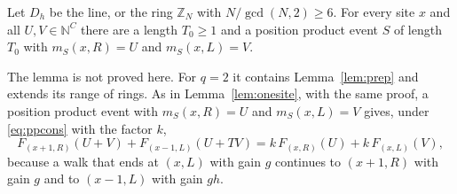 \begin{lemma}\label{lem:prepq}
Let $D_h$ be the line, or the ring $\mathbb{Z}_N$ with $N/\gcd(N,2)\ge6$. For every site $x$ and all $U,V\in\mathbb{N}^C$ there are a length $T_0\ge1$ and a position product event $S$ of length $T_0$ with $m_S(x,R)=U$ and $m_S(x,L)=V$.
\end{lemma}

The lemma is not proved here. For $q=2$ it contains Lemma~\ref{lem:prep} and extends its range of rings. As in Lemma~\ref{lem:onesite}, with the same proof, a position product event with $m_S(x,R)=U$ and $m_S(x,L)=V$ gives, under \eqref{eq:ppcons} with the factor $k$,
\begin{equation}\label{eq:Eq}
F_{(x+1,R)}(U+V)+F_{(x-1,L)}(U+TV)=k\,F_{(x,R)}(U)+k\,F_{(x,L)}(V),
\end{equation}
because a walk that ends at $(x,L)$ with gain $g$ continues to $(x+1,R)$ with gain $g$ and to $(x-1,L)$ with gain $gh$.

